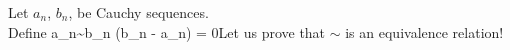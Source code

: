 \documentclass[preview]{standalone}
\begin{document}
\begin{center}
Let $a_n$, $b_n$, be Cauchy sequences.\\Define a_n\sim b_n \iff \lim(b_n - a_n) = 0Let us prove that $\sim$ is an equivalence relation!
\end{center}
\end{document}
